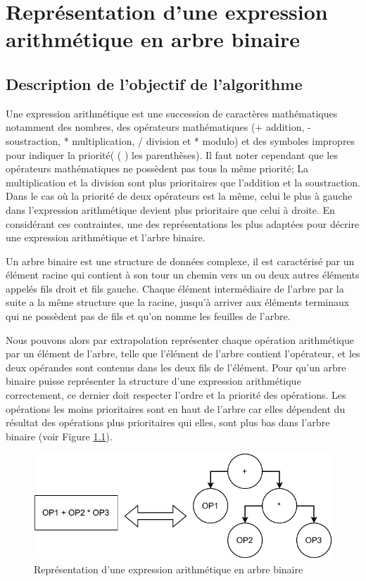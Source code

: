 \chapter{Représentation d'une expression arithmétique en arbre binaire}

\section{Description de l'objectif de l'algorithme}
Une expression arithmétique est une succession de caractères mathématiques notamment des nombres, des opérateurs mathématiques (+ addition, - soustraction, * multiplication, / division et * modulo) et des symboles impropres pour indiquer la priorité( ( ) les parenthèses).
Il faut noter cependant que les opérateurs mathématiques ne possèdent pas tous la même priorité; La multiplication et la division sont plus prioritaires que l'addition et la soustraction.
Dans le cas où la priorité de deux opérateurs est la même, celui le plus à gauche dans l'expression arithmétique devient plus prioritaire que celui à droite.
En considérant ces contraintes, une des représentations les plus adaptées pour décrire une expression arithmétique et l'arbre binaire.
\par
Un arbre binaire est une structure de données complexe, il est caractérisé par un élément racine qui contient à son tour un chemin vers un ou deux autres éléments appelés fils droit et fils gauche. Chaque élément intermédiaire de l'arbre par la suite a la même structure que la racine, jusqu'à arriver aux éléments terminaux qui ne possèdent pas de fils et qu'on nomme les feuilles de l'arbre.
\par
Nous pouvons alors par extrapolation représenter chaque opération arithmétique par un élément de l'arbre, telle que l'élément de l'arbre contient l'opérateur, et les deux opérandes sont contenus dans les deux fils de l'élément.
Pour qu'un arbre binaire puisse représenter la structure d'une expression arithmétique correctement, ce dernier doit respecter l'ordre et la priorité des opérations. Les opérations les moins prioritaires sont en haut de l'arbre car elles dépendent du résultat des opérations plus prioritaires qui elles, sont plus bas dans l'arbre binaire (voir Figure \ref{fig:exp_arbre}).

\begin{figure}[H]
    \centering
        \includegraphics[scale=1.0]{./ressources/expression_to_tree.pdf}
        \caption{Représentation d'une expression arithmétique en arbre binaire}
    \label{fig:exp_arbre}
\end{figure}

